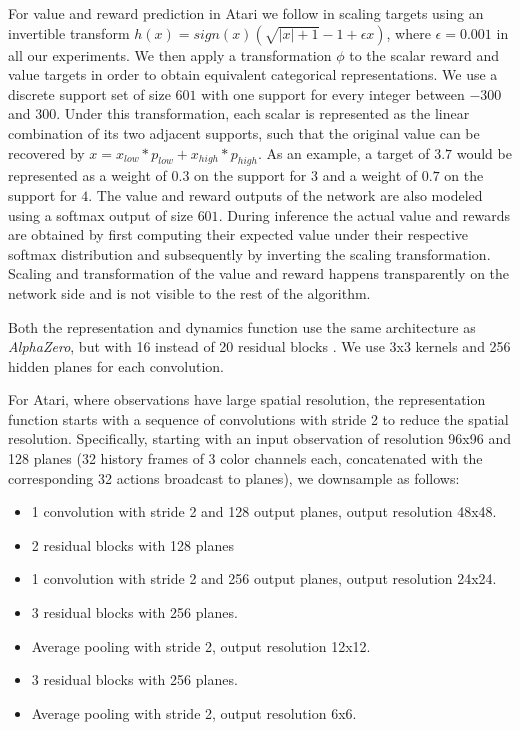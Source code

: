 \documentclass{article}
\newcommand{\alphazero}{\emph{AlphaZero}}
\begin{document}
\begin{appendices}
For value and reward prediction in Atari we follow \cite{pohlen2018observe} in scaling targets using an invertible transform $h(x) = sign(x)(\sqrt{|x| + 1} - 1 + \epsilon x)$, where $\epsilon = 0.001$ in all our experiments. We then apply a transformation $\phi$ to the scalar reward and value targets in order to obtain equivalent categorical representations. We use a discrete support set of size $601$ with one support for every integer between $-300$ and $300$. Under this transformation, each scalar is represented as the linear combination of its two adjacent supports, such that the original value can be recovered by $x = x_{low} * p_{low} + x_{high} * p_{high}$. As an example, a target of $3.7$ would be represented as a weight of $0.3$ on the support for $3$ and a weight of $0.7$ on the support for $4$. The value and reward outputs of the network are also modeled using a softmax output of size $601$. During inference the actual value and rewards are obtained by first computing their expected value under their respective softmax distribution and subsequently by inverting the scaling transformation. Scaling and transformation of the value and reward happens transparently on the network side and is not visible to the rest of the algorithm.

Both the representation and dynamics function use the same architecture as \alphazero{}, but with 16 instead of 20 residual blocks \cite{he:resnet}. We use 3x3 kernels and 256 hidden planes for each convolution.

For Atari, where observations have large spatial resolution, the representation function starts with a sequence of convolutions with stride 2 to reduce the spatial resolution. Specifically, starting with an input observation of resolution 96x96 and 128 planes (32 history frames of 3 color channels each, concatenated with the corresponding 32 actions broadcast to planes), we downsample as follows:

\begin{itemize}
\item 1 convolution with stride 2 and 128 output planes, output resolution 48x48.
\item 2 residual blocks with 128 planes
\item 1 convolution with stride 2 and 256 output planes, output resolution 24x24.
\item 3 residual blocks with 256 planes.
\item Average pooling with stride 2, output resolution 12x12.
\item 3 residual blocks with 256 planes.
\item Average pooling with stride 2, output resolution 6x6.
\end{itemize}


\end{appendices}
\end{document}
